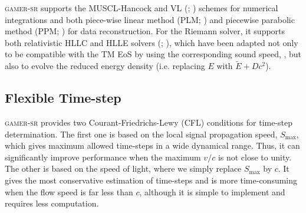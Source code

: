 \documentclass[twocolumn]{aastex63}
\begin{document}
\textsc{gamer-sr} supports the MUSCL-Hancock \citep{Toro} and VL (\citealt{VL1}; \citealt{VL2}) schemes for numerical integrations and both piece-wise linear method (PLM; \citealt{van_Leer_1979}) and piecewise parabolic method (PPM; \citealt{Woodward1984}) for data reconstruction. For the Riemann solver, it supports both relativistic HLLC and HLLE solvers (\citealt{HLLC_srhydro}; \citealt{HLLC_srmhd}), which have been adapted not only to be compatible with the TM EoS by using the corresponding sound speed, , but also to evolve the reduced energy density (i.e. replacing $E$ with $\tilde{E}+Dc^2$).


\subsection{Flexible Time-step}
\textsc{gamer-sr} provides two Courant-Friedrichs-Lewy (CFL) conditions for time-step determination. The first one is based on the local signal propagation speed, $S_{\text{max}}$, which gives maximum allowed time-steps in a wide dynamical range. Thus, it can significantly improve performance when the maximum $v/c$ is not close to unity. The other is based on the speed of light, where we simply replace $S_{\text{max}}$ by $c$. It gives the most conservative estimation of time-steps and is more time-consuming when the flow speed is far less than $c$, although it is simple to implement and requires less computation.
\end{document}
